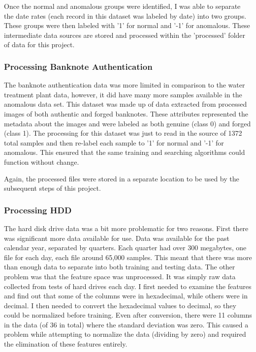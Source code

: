 \documentclass[journal]{IEEEtran}
\begin{document}
Once the normal and anomalous groups were identified, I was able to separate the date rates (each record in this dataset was labeled by date) into two groups. These groups were then labeled with '1' for normal and '-1' for anomalous. These intermediate data sources are stored and processed within the 'processed' folder of data for this project.

\subsubsection{Processing Banknote Authentication}
The banknote authentication data was more limited in comparison to the water treatment plant data, however, it did have many more samples available in the anomalous data set. This dataset was made up of data extracted from processed images of both authentic and forged banknotes. These attributes represented the metadata about the images and were labeled as both genuine (class 0) and forged (class 1). The processing for this dataset was just to read in the source of  1372 total samples and then re-label each sample to '1' for normal and '-1' for anomalous. This ensured that the same training and searching algorithms could function without change.

Again, the processed files were stored in a separate location to be used by the subsequent steps of this project.

\subsubsection{Processing HDD}
The hard disk drive data was a bit more problematic for two reasons. First there was significant more data available for use. Data was available for the past calendar year, separated by quarters. Each quarter had over 300 megabytes, one file for each day, each file around 65,000 samples. This meant that there was more than enough data to separate into both training and testing data. The other problem was that the feature space was unprocessed. It was simply raw data collected from tests of hard drives each day. I first needed to examine the features and find out that some of the columns were in hexadecimal, while others were in decimal. I then needed to convert the hexadecimal values to decimal, so they could be normalized before training. Even after conversion, there were 11 columns in the data (of 36 in total) where the standard deviation was zero. This caused a problem while attempting to normalize the data (dividing by zero) and required the elimination of these features entirely.
\end{document}

